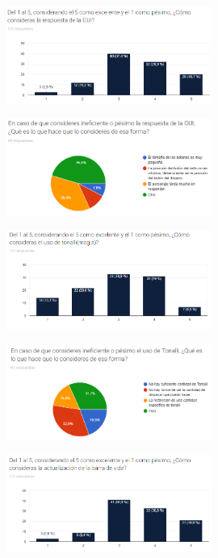 \begin{figure}[H]
    \centering
    \includegraphics[width=0.6\textwidth]{Anexos/respuestas/grafica09.png}
\end{figure}

\begin{figure}[H]
    \centering
    \includegraphics[width=0.6\textwidth]{Anexos/respuestas/grafica10.png}
\end{figure}

\begin{figure}[H]
    \centering
    \includegraphics[width=0.6\textwidth]{Anexos/respuestas/grafica11.png}
\end{figure}

\begin{figure}[H]
    \centering
    \includegraphics[width=0.6\textwidth]{Anexos/respuestas/grafica12.png}
\end{figure}

\begin{figure}[H]
    \centering
    \includegraphics[width=0.6\textwidth]{Anexos/respuestas/grafica13.png}
\end{figure}

